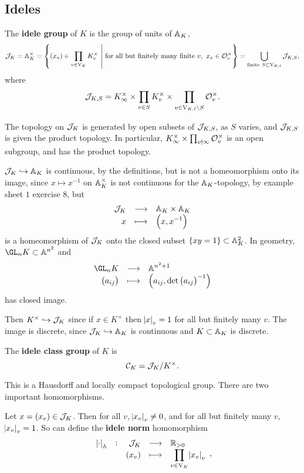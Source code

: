 \subsection{Ideles}

\begin{definition*}
The \textbf{idele group} of $ K $ is the group of units of $ \AA_K $,
$$ \JJJ_K = \AA_K^\times = \cbr{\br{x_v} \in \prod_{v \in \V_K} K_v^\times \st \text{for all but finitely many finite} \ v, \ x_v \in \OOO_v^\times} = \bigcup_{\text{finite} \ S \subset \V_{K, \f}} \JJJ_{K, S}, $$
where
$$ \JJJ_{K, S} = K_\infty^\times \times \prod_{v \in S} K_v^\times \times \prod_{v \in \V_{K, \f} \setminus S} \OOO_v^\times. $$
\end{definition*}

The topology on $ \JJJ_K $ is generated by open subsets of $ \JJJ_{K, S} $, as $ S $ varies, and $ \JJJ_{K, S} $ is given the product topology. In particular, $ K_\infty^\times \times \prod_{v \nmid \infty} \OOO_v^\times $ is an open subgroup, and has the product topology.

\begin{remark*}
$ \JJJ_K \hookrightarrow \AA_K $ is continuous, by the definitions, but is not a homeomorphism onto its image, since $ x \mapsto x^{-1} $ on $ \AA_K^\times $ is not continuous for the $ \AA_K $-topology, by example sheet $ 1 $ exercise $ 8 $, but
$$ \function{\JJJ_K}{\AA_K \times \AA_K}{x}{\br{x, x^{-1}}} $$
is a homeomorphism of $ \JJJ_K $ onto the closed subset $ \cbr{xy = 1} \subset \AA_K^2 $. In geometry, $ \GL_n K \subset \AA^{n^2} $ and
$$ \function{\GL_n K}{\AA^{n^2 + 1}}{\br{a_{ij}}}{\br{a_{ij}, \det \br{a_{ij}}^{-1}}} $$
has closed image.
\end{remark*}

Then $ K^\times \hookrightarrow \JJJ_K $ since if $ x \in K^\times $ then $ \abs{x}_v = 1 $ for all but finitely many $ v $. The image is discrete, since $ \JJJ_K \hookrightarrow \AA_K $ is continuous and $ K \subset \AA_K $ is discrete.

\pagebreak


\begin{definition*}
The \textbf{idele class group} of $ K $ is
$$ \CCC_K = \JJJ_K / K^\times. $$
\end{definition*}

This is a Hausdorff and locally compact topological group. There are two important homomorphisms.

\begin{definition*}
Let $ x = \br{x_v} \in \JJJ_K $. Then for all $ v $, $ \abs{x_v}_v \ne 0 $, and for all but finitely many $ v $, $ \abs{x_v}_v = 1 $. So can define the \textbf{idele norm} homomorphism
$$ \function[\abs{\cdot}_\AA]{\JJJ_K}{\RR_{> 0}}{\br{x_v}}{\prod_{v \in \V_K} \abs{x_v}_v}, $$
\end{definition*}

